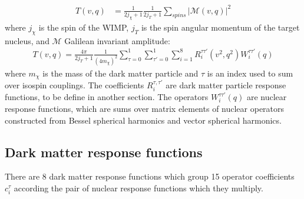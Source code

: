 \documentclass[11pt]{amsart}
\begin{document}
\begin{equation}
\begin{split}
T(v,q) &= \frac{1}{2j_\chi+1}\frac{1}{2j_T+1}\sum_{spins}|\mathcal{M}(v,q)|^2 
\end{split}
\end{equation}
where $j_\chi$ is the spin of the WIMP, $j_T$ is the spin angular momentum of the target nucleus, and $\mathcal{M}$ Galilean invariant amplitude:
\begin{align}
	T(v,q) = \frac{4\pi}{2j_T+1}\frac{1}{(4m_\chi)^2}
		\sum_{\tau=0}^1\sum_{\tau'=0}^1\sum_{i=1}^8 R_i^{\tau\tau'}(v^2,q^2)
		W_i^{\tau\tau'}(q)
\end{align}
where $m_\chi$ is the mass of the dark matter particle and $\tau$ is an index used to sum over isospin couplings. The coefficients $R_i^{\tau,\tau'}$ are dark matter particle response functions, to be define in another section. The operators $W_i^{\tau\tau'}(q)$ are nuclear response functions, which are sums over matrix elements of nuclear operators constructed from Bessel spherical harmonics and vector spherical harmonics.
\subsection{Dark matter response functions}
There are 8 dark matter response functions which group 15 operator coefficients $c_i^\tau$ according the pair of nuclear response functions which they multiply.
\end{document}
